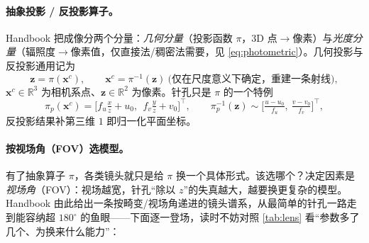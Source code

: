 \paragraph{抽象投影 / 反投影算子。}
Handbook\cite{carlone2026handbook} 把成像分两个分量：\emph{几何分量}（投影函数 $\pi$，3D 点$\to$像素）与\emph{光度分量}（辐照度$\to$像素值，仅直接法/稠密法需要，见 \cref{eq:photometric}）。几何投影与反投影通用记为
\begin{equation}
  \mathbf{z}=\pi(\mathbf{x}^c),\qquad
  \mathbf{x}^c=\pi^{-1}(\mathbf{z})\ \text{(仅在尺度意义下确定，重建一条射线)},
  \label{eq:abstract-pi}
\end{equation}
$\mathbf{x}^c\in\mathbb{R}^3$ 为相机系点、$\mathbf{z}\in\mathbb{R}^2$ 为像素。针孔只是 $\pi$ 的一个特例
\begin{equation}
  \pi_p(\mathbf{x}^c)=\Big[f_u\tfrac{x}{z}+u_0,\ \ f_v\tfrac{y}{z}+v_0\Big]^\top,\qquad
  \pi_p^{-1}(\mathbf{z})\sim\Big[\tfrac{u-u_0}{f_u},\ \tfrac{v-v_0}{f_v}\Big]^\top,
  \label{eq:pi-pinhole}
\end{equation}
反投影结果补第三维 $1$ 即归一化平面坐标。

\paragraph{按视场角（FOV）选模型。}
有了抽象算子 $\pi$，各类镜头就只是给 $\pi$ 换一个具体形式。该选哪个？决定因素是\emph{视场角}（FOV）：视场越宽，针孔“除以 $z$”的失真越大，越要换更复杂的模型。Handbook\cite{carlone2026handbook} 由此给出一条按畸变/视场角递进的镜头谱系，从最简单的针孔一路走到能容纳超 $180^\circ$ 的鱼眼——下面逐一登场，读时不妨对照 \cref{tab:lens} 看“参数多了几个、为换来什么能力”：

